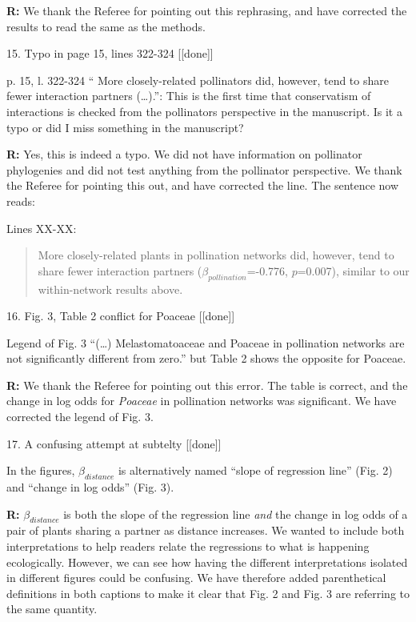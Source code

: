 \documentclass[12pt]{letter}
\newenvironment{refquote}{\bigskip \begin{it}}{\end{it}\smallskip}
\begin{document}
		\textbf{R:} We thank the Referee for pointing out this rephrasing, and have corrected the results to read the same as the methods.


	15. Typo in page 15, lines 322-324 [[done]]

		\begin{refquote}
			p. 15, l. 322-324 “ More closely-related pollinators did, however, tend to share fewer interaction partners (…).”: This is the first time that conservatism of interactions is checked from the pollinators perspective in the manuscript. Is it a typo or did I miss something in the manuscript?
		\end{refquote}


		\textbf{R:} Yes, this is indeed a typo. We did not have information on pollinator phylogenies and did not test anything from the pollinator perspective. We thank the Referee for pointing this out, and have corrected the line. The sentence now reads:

		Lines XX-XX:
		\begin{quotation}
			More closely-related plants in pollination networks did, however, tend to share fewer interaction partners ($\beta_{pollination}$=-0.776, $p$=0.007), similar to our within-network results above.
		\end{quotation}


	16. Fig. 3, Table 2 conflict for Poaceae [[done]]

		\begin{refquote}
			Legend of Fig. 3 “(…) Melastomatoaceae and Poaceae in pollination networks are not significantly different from zero.” but Table 2 shows the opposite for Poaceae.
		\end{refquote}

		\textbf{R:} We thank the Referee for pointing out this error. The table is correct, and the change in log odds for \emph{Poaceae} in pollination networks was significant. We have corrected the legend of Fig. 3.


	17. A confusing attempt at subtelty [[done]]

		\begin{refquote}
			In the figures, $\beta_{distance}$ is alternatively named “slope of regression line” (Fig. 2) and “change in log odds” (Fig. 3).
		\end{refquote}


		\textbf{R:} $\beta_{distance}$ is both the slope of the regression line \emph{and} the change in log odds of a pair of plants sharing a partner as distance increases. We wanted to include both interpretations to help readers relate the regressions to what is happening ecologically. However, we can see how having the different interpretations isolated in different figures could be confusing. We have therefore added parenthetical definitions in both captions to make it clear that Fig. 2 and Fig. 3 are referring to the same quantity.
\end{document}
